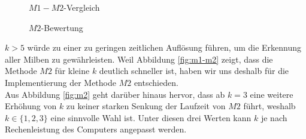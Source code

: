 \documentclass[11pt,a4paper]{article}
\begin{document}
\begin{figure}[H]
    \centering
    \begin{minipage}{.45\textwidth}
        \caption{$M1-M2$-Vergleich}
        \label{fig:m1-m2}
    \end{minipage}
    \begin{minipage}{.45\textwidth}
        \caption{$M2$-Bewertung}
        \label{fig:m2}
    \end{minipage}
\end{figure}
\noindent
$k > 5$ würde zu einer zu geringen zeitlichen Auflösung führen, um die Erkennung aller Milben zu gewährleisten. Weil Abbildung \autoref{fig:m1-m2} zeigt, dass die Methode $M2$ für kleine $k$ deutlich schneller ist, haben wir uns deshalb für die Implementierung der Methode $M2$ entschieden.\\
Aus Abbildung \autoref{fig:m2} geht darüber hinaus hervor, dass ab $k = 3$ eine weitere Erhöhung von $k$ zu keiner starken Senkung der Laufzeit von $M2$ führt, weshalb $k \in \{1, 2, 3\}$ eine sinnvolle Wahl ist. Unter diesen drei Werten kann $k$ je nach Rechenleistung des Computers angepasst werden.
\end{document}

